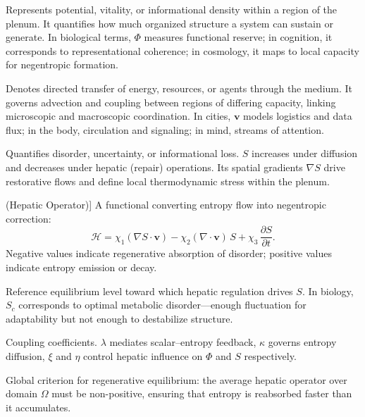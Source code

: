 \documentclass[12pt]{article}
\begin{document}
\begin{description}[leftmargin=2em, labelwidth=1.5em, style=nextline]
  \item[\(\Phi\) (Scalar Capacity)] 
  Represents potential, vitality, or informational density within a region of the plenum.  It quantifies how much organized structure a system can sustain or generate.  In biological terms, \(\Phi\) measures functional reserve; in cognition, it corresponds to representational coherence; in cosmology, it maps to local capacity for negentropic formation.

  \item[\(\mathbf{v}\) (Vector Flow)] 
  Denotes directed transfer of energy, resources, or agents through the medium.  It governs advection and coupling between regions of differing capacity, linking microscopic and macroscopic coordination.  In cities, \(\mathbf{v}\) models logistics and data flux; in the body, circulation and signaling; in mind, streams of attention.

  \item[\(S\) (Entropy Field)] 
  Quantifies disorder, uncertainty, or informational loss.  \(S\) increases under diffusion and decreases under hepatic (repair) operations.  Its spatial gradients \(\nabla S\) drive restorative flows and define local thermodynamic stress within the plenum.

  \item[\(\mathcal{H}[\Phi,\mathbf{v},S]\) (Hepatic Operator)] 
  A functional converting entropy flow into negentropic correction:
  \[
  \mathcal{H} = \chi_1(\nabla S\!\cdot\!\mathbf{v}) 
               - \chi_2(\nabla\!\cdot\!\mathbf{v})\,S
               + \chi_3\,\frac{\partial S}{\partial t}.
  \]
  Negative values indicate regenerative absorption of disorder; positive values indicate entropy emission or decay.

  \item[\(S_c\) (Critical Entropy)] 
  Reference equilibrium level toward which hepatic regulation drives \(S\).  In biology, \(S_c\) corresponds to optimal metabolic disorder—enough fluctuation for adaptability but not enough to destabilize structure.

  \item[\(\lambda, \kappa, \xi, \eta\)] 
  Coupling coefficients.  \(\lambda\) mediates scalar–entropy feedback, \(\kappa\) governs entropy diffusion, \(\xi\) and \(\eta\) control hepatic influence on \(\Phi\) and \(S\) respectively.

  \item[\(\langle \mathcal{H} \rangle_\Omega \le 0\) (Longevity Condition)] 
  Global criterion for regenerative equilibrium: the average hepatic operator over domain \(\Omega\) must be non-positive, ensuring that entropy is reabsorbed faster than it accumulates.


\end{description}
\end{document}
